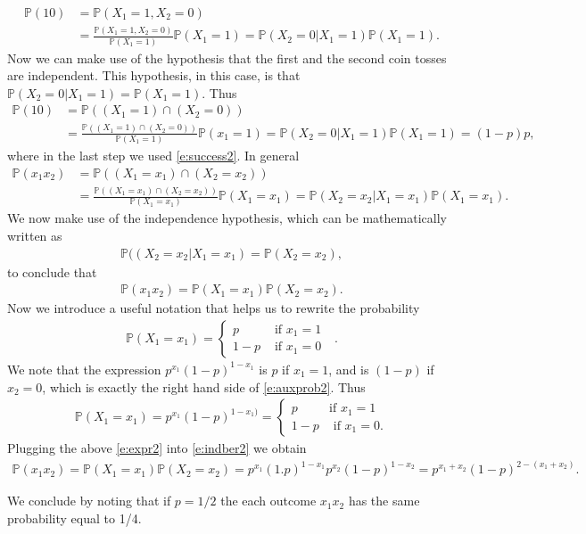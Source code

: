 \documentclass[12pt]{article}
\newcommand{\<}{{\langle \!\! \langle}}
\renewcommand{\>}{{\rangle \!\! \rangle}}
\newcommand{\bel}[2]{\begin{equation} \label{#1} \begin{split} #2
 					\end{split} \end{equation}}
\begin{document}
\bel{}{\mathbb{P}(10) & =\mathbb{P}(X_1=1,X_2=0) \\
 & = \frac{\mathbb{P}(X_1=1,X_2=0)}{\mathbb{P}(X_1=1)}\mathbb{P}(X_1=1)=\mathbb{P}(X_2=0|X_1=1)\mathbb{P}(X_1=1).}
Now we can make use of the hypothesis that the first and the second coin tosses are independent. This hypothesis, in this case, is that $\mathbb{P}(X_2=0|X_1 = 1) =\mathbb{P}( X_1 = 1)$.
Thus  
\bel{}{\mathbb{P}(10) & = \mathbb{P}((X_1 =1 ) \cap (X_2 = 0 ) ) \\
 & = \frac{\mathbb{P}( (X_1 = 1) \cap (X_2 = 0))}{\mathbb{P}(X_1 = 1)}\mathbb{P}(x_1 = 1)= \mathbb{P}(X_2 = 0|X_1 = 1) \mathbb{P}(X_1 = 1) = (1-p)p, }
 where in the last step we used \ref{e:success2}.
 In general
\bel{}{\mathbb{P}(x_1x_2) & =\mathbb{P}((X_1=x_1) \cap (X_2=x_2)) \\
 & = \frac{\mathbb{P}((X_1=x_1)\cap (X_2=x_2))}{\mathbb{P}(X_1=x_1)}\mathbb{P}(X_1=x_1)=\mathbb{P}(X_2=x_2|X_1=x_1)\mathbb{P}(X_1=x_1). }
We now make use of the independence hypothesis, which can be mathematically written as 
\bel{e:independence2}{\mathbb{P}((X_2 = x_2 |X_1 = x_1) = \mathbb{P}( X_2 = x_2), }
to conclude that 
\bel{e:indber2}{\mathbb{P}(x_1x_2)= \mathbb{P}(X_1 = x_1) \mathbb{P}(X_2 = x_2).}
Now we introduce a useful notation  that helps us to rewrite the probability 
\bel{e:auxprob2}{\mathbb{P}(X_1 = x_1)= \begin{cases} p  & \textrm{ if $x_1 = 1$} \\ 1-p & \textrm{ if $x_1 = 0$ } \end{cases}.}
	We note that the expression $p^{x_1}( 1- p)^{1-x_1}$  is $p$ if $x_1 = 1$, and is $(1-p)$ if $x_2 = 0$, which is exactly the right hand side of \ref{e:auxprob2}. Thus
	\bel{e:expr2}{\mathbb{P}( X_1 = x_1) = p^{x_1}(1-p)^{1-x_1)}= \begin{cases} p & \textrm{if $x_1 =1$ } \\ 1-p & \textrm{ if $x_1 = 0$.}\end{cases}}
		Plugging the above \eqref{e:expr2} into \eqref{e:indber2} we obtain 
		\bel{e:bernoulli2}{\mathbb{P}(x_1x_2) = \mathbb{P}(X_1 = x_1) \mathbb{P}(X_2 = x_2 ) = p^{x_1}(1.p)^{1-x_1}p^{x_2}(1-p)^{1-x_2}= p ^{x_1 + x_2 }(1-p )^{2-(x_1+ x_2)}.}

We conclude by noting that if $p=1/2$ the each outcome $x_1x_2$ has the same probability equal to 1/4. 
\end{document}

